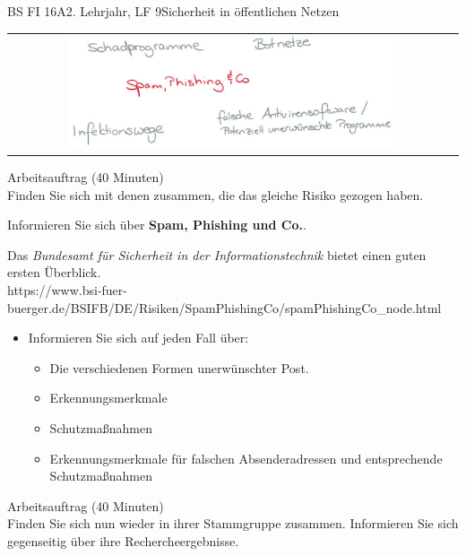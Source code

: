 \documentclass[oneside,openany,headings=optiontotoc,11pt,numbers=noenddot]{scrreprt}
\begin{document}
	\begin{worksheet}{BS FI 16A}{2. Lehrjahr, LF 9}{Sicherheit in öffentlichen Netzen}
		
		\newpage
		\setcounter{page}{1}
		\begin{framed}
			\begin{tabular}{lcr}
				& \includegraphics[width=0.8\textwidth]{Bilder/SpamPhishing.jpg} & \\
			\end{tabular}
		\end{framed}
		\color{codegray}Arbeitsauftrag (40 Minuten)\\
		\color{black}
		Finden Sie sich mit denen zusammen, die das gleiche Risiko gezogen haben.
		\par
		\bigskip
		\noindent
		Informieren Sie sich über \textbf{Spam, Phishing und Co.}.
		\par\bigskip\noindent
		Das \textit{Bundesamt für Sicherheit in der Informationstechnik} bietet einen guten ersten Überblick.\\
		\small{\color{codegray}https://www.bsi-fuer-buerger.de/BSIFB/DE/Risiken/SpamPhishingCo/spamPhishingCo\_node.html}
		\normalsize
		\begin{itemize}
			\item[] Informieren Sie sich auf jeden Fall über:
			\begin{itemize}
				\item Die verschiedenen Formen unerwünschter Post.
				\item Erkennungsmerkmale
				\item Schutzmaßnahmen
				\item Erkennungsmerkmale für falschen Absenderadressen und entsprechende Schutzmaßnahmen
			\end{itemize}
		\end{itemize}
		\par
		\bigskip
		\noindent
		
		\color{codegray}Arbeitsauftrag (40 Minuten)\\
		\color{black}
		Finden Sie sich nun wieder in ihrer Stammgruppe zusammen. Informieren Sie sich gegenseitig über ihre Rechercheergebnisse.
	\end{worksheet}
\end{document}
